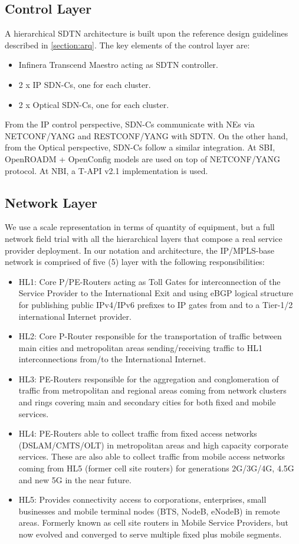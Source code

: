 \documentclass[a4paper,fleqn]{cas-dc}
\begin{document}
\subsection{Control Layer}
\label{sec:contollay}
A hierarchical SDTN architecture is built upon the reference design guidelines described in \cref{section:arq}. The key elements of the control layer are:
\begin{itemize}
    \item Infinera Transcend Maestro acting as SDTN controller.
    \item 2 x IP SDN-Cs, one for each cluster.
    \item 2 x Optical SDN-Cs, one for each cluster.
\end{itemize}

From the IP control perspective, SDN-Cs communicate with NEs via NETCONF/YANG and RESTCONF/YANG with SDTN.  On the other hand, from the Optical perspective, SDN-Cs follow a similar integration. At SBI, OpenROADM + OpenConfig models are used on top of NETCONF/YANG protocol. At NBI, a T-API v2.1 implementation is used.  

\subsection{Network Layer}
\label{sec:netlay}
We use a scale representation in terms of quantity of equipment, but a full network field trial with all the hierarchical layers that compose a real service provider deployment. In our notation and architecture, the IP/MPLS-base network is comprised of five (5) layer with the following responsibilities: 
\begin{itemize}
    \item HL1: Core P/PE-Routers acting as Toll Gates for interconnection of the Service Provider to the International Exit and using eBGP logical structure for publishing public IPv4/IPv6 prefixes to IP gates from and to a Tier-1/2 international Internet provider.
    \item HL2: Core P-Router responsible for the transportation of traffic between main cities and metropolitan areas sending/receiving traffic to HL1 interconnections from/to the International Internet.
    \item HL3: PE-Routers responsible for the aggregation and conglomeration of traffic from metropolitan and regional areas coming from network clusters and rings covering main and secondary cities for both fixed and mobile services.
    \item HL4: PE-Routers able to collect traffic from fixed access networks (DSLAM/CMTS/OLT) in metropolitan areas and high capacity corporate services. These are also able to collect traffic from mobile access networks coming from HL5 (former cell site routers) for generations 2G/3G/4G, 4.5G and new 5G in the near future.
    \item HL5: Provides connectivity access to corporations, enterprises, small businesses and mobile terminal nodes (BTS, NodeB, eNodeB) in remote areas. Formerly known as cell site routers in Mobile Service Providers, but now evolved and converged to serve multiple fixed plus mobile segments.     
\end{itemize}
\end{document}
